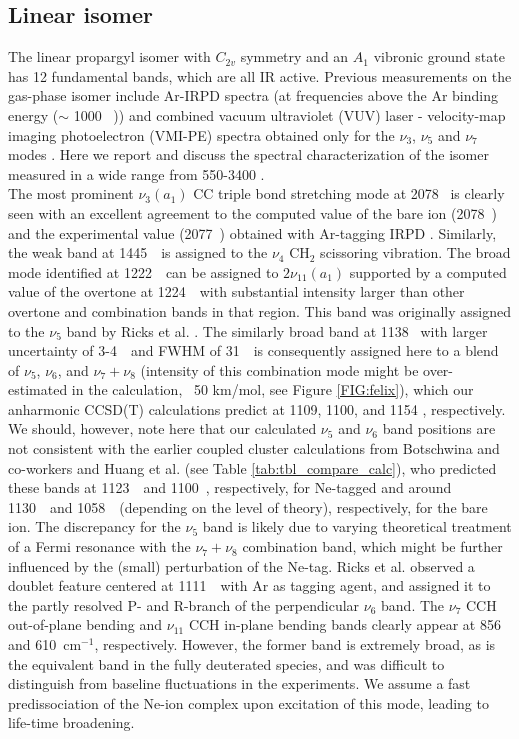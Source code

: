 \subsection{Linear isomer}
\label{linear}
\vspace{0.5cm}
The linear propargyl isomer with $C_{2v}$ symmetry and an $A_1$ vibronic ground state has 12 fundamental bands, which are all IR active. Previous measurements on the gas-phase \lin isomer include Ar-IRPD spectra (at frequencies above the Ar binding energy ($\sim$ 1000~ \wn)) \citep{RDS2010} and combined vacuum ultraviolet (VUV) laser - velocity-map imaging photoelectron (VMI-PE) spectra obtained only for the $\nu_3$, $\nu_5$ and $\nu_7$ modes \citep{GLY2012}. Here we report and discuss the spectral characterization of the \lin isomer measured in a wide range from 550-3400 \wn. \\

The most prominent $\nu_3(a_1)$ CC triple bond stretching mode at 2078 \wn\ is clearly seen with an excellent agreement to the computed value of the bare ion (2078~\wnn) and the experimental value (2077~\wnn) obtained with Ar-tagging IRPD \citep{RDS2010}. Similarly, the weak band at 1445~\wn\ is assigned to the $\nu_4$ CH$_2$ scissoring vibration. The broad mode identified at 1222~\wn\ can be assigned to $2\nu_{11} (a_1)$ supported by a computed value of the overtone at 1224~\wn\ with substantial intensity larger than other overtone and combination bands in that region. This band was originally assigned to the $\nu_5$ band by Ricks et al. \citep{RDS2010}.  The similarly broad band at 1138 \wn\ with larger uncertainty of 3-4~\wn\ and FWHM of 31~\wn\ is consequently assigned here to a blend of $\nu_5$, $\nu_6$, and $\nu_7+\nu_8$ (intensity of this combination mode might be over-estimated in the calculation, ~50 km/mol, see Figure \ref{FIG:felix}), which our anharmonic CCSD(T) calculations predict at 1109, 1100, and 1154 \wnn, respectively. We should, however, note here that our calculated $\nu_5$ and $\nu_6$ band positions are not consistent with the earlier coupled cluster calculations from Botschwina and co-workers \citep{Botschwina2011, BOR2011} and Huang et al. \citep{HTL2011} (see Table \ref{tab:tbl_compare_calc}), who predicted these bands at 1123~\wn\ and 1100~\wnn, respectively, for Ne-tagged \lin and around 1130~\wn\ and 1058~\wn\ (depending on the level of theory), respectively, for the bare ion. The discrepancy for the $\nu_5$ band is likely due to varying theoretical treatment of a Fermi resonance with the $\nu_7+\nu_8$ combination band, which might be further influenced by the (small) perturbation of the Ne-tag. Ricks et al. \citep{RDS2010} observed a doublet feature centered at 1111~\wn\ with Ar as tagging agent, and assigned it to the partly resolved P- and R-branch of the perpendicular $\nu_6$ band.  The $\nu_7$ CCH out-of-plane bending and $\nu_{11}$ CCH in-plane bending bands clearly appear at 856 and 610~cm$^{-1}$, respectively. However, the former band is extremely broad, as is the equivalent band in the fully deuterated species, and was difficult to distinguish from baseline fluctuations in the experiments. We assume a fast predissociation of the Ne-ion complex upon excitation of this mode, leading to life-time broadening. \\

